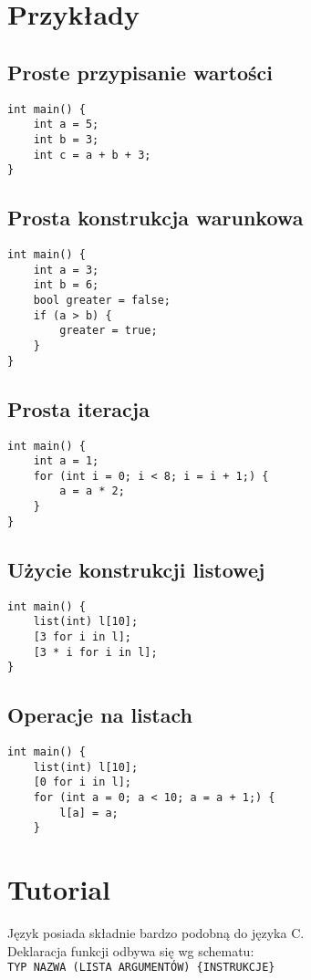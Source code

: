 \documentclass{article}
\begin{document}
\section{Przykłady}
\subsection{Proste przypisanie wartości}
\begin{lstlisting}[tabsize=2]
int main() {
	int a = 5;
	int b = 3;
	int c = a + b + 3;
}
\end{lstlisting}

\subsection{Prosta konstrukcja warunkowa}
\begin{lstlisting}[tabsize=2]
int main() {
	int a = 3;
	int b = 6;
	bool greater = false;
	if (a > b) {
		greater = true;
	}
}
\end{lstlisting}

\subsection{Prosta iteracja}
\begin{lstlisting}[tabsize=2]
int main() {
	int a = 1;
	for (int i = 0; i < 8; i = i + 1;) {
		a = a * 2;
	}
}
\end{lstlisting}

\subsection{Użycie konstrukcji listowej}
\begin{lstlisting}[tabsize=2]
int main() {
	list(int) l[10];
	[3 for i in l];
	[3 * i for i in l];
}
\end{lstlisting}

\subsection{Operacje na listach}
\begin{lstlisting}[tabsize=2]
int main() {
	list(int) l[10];
	[0 for i in l];
	for (int a = 0; a < 10; a = a + 1;) {
		l[a] = a;
	}
\end{lstlisting}
\newpage

\section{Tutorial}
Język posiada składnie bardzo podobną do języka C. \\
Deklaracja funkcji odbywa się wg schematu: \\
\texttt{TYP NAZWA (LISTA ARGUMENTÓW) \{INSTRUKCJE\}} \\
\end{document}

